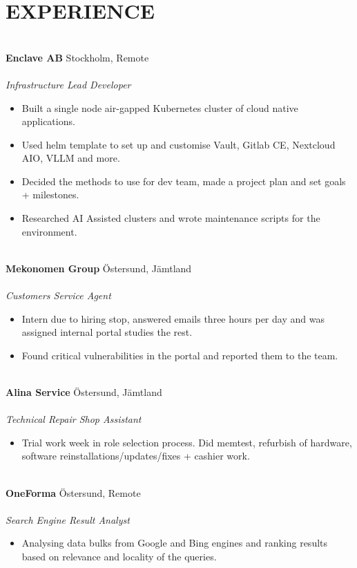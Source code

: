 \documentclass[10pt, a4paper]{article}
\begin{document}
\section*{EXPERIENCE}
\texttt{}\\[-0.5cm]
\textbf{Enclave AB} \hfill Stockholm, Remote\\
\noindent{}\\
\textit{Infrastructure Lead Developer}\\
\begin{itemize}[leftmargin=0.3cm, itemsep=0.1cm]
\item Built a single node air-gapped Kubernetes cluster of cloud native applications.
\item Used helm template to set up and customise Vault, Gitlab CE, Nextcloud AIO, VLLM and more.
\item Decided the methods to use for dev team, made a project plan and set goals + milestones.
\item Researched AI Assisted clusters and wrote maintenance scripts for the environment.
\end{itemize}
\texttt{}\\[-0.2cm]
\textbf{Mekonomen Group} \hfill Östersund, Jämtland\\
\noindent{}\\
\textit{Customers Service Agent}\\
\begin{itemize}[leftmargin=0.3cm, itemsep=0.1cm]
\item Intern due to hiring stop, answered emails three hours per day and was assigned internal portal studies the rest.
\item Found critical vulnerabilities in the portal and reported them to the team. 
\end{itemize}
\texttt{}\\[-0.2cm]
\textbf{Alina Service} \hfill Östersund, Jämtland\\
\noindent{}\\
\textit{Technical Repair Shop Assistant}\\
\begin{itemize}[leftmargin=0.3cm, itemsep=0.1cm]
\item Trial work week in role selection process. Did memtest, refurbish of hardware, software reinstallations/updates/fixes + cashier work.
\end{itemize}
\texttt{}\\[-0.2cm]
\textbf{OneForma} \hfill Östersund, Remote\\
\noindent{}\\
\textit{Search Engine Result Analyst}\\
\begin{itemize}[leftmargin=0.3cm, itemsep=0.1cm]
\item Analysing data bulks from Google and Bing engines and ranking results based on relevance and locality of the queries. 
\end{itemize}
\end{document}
